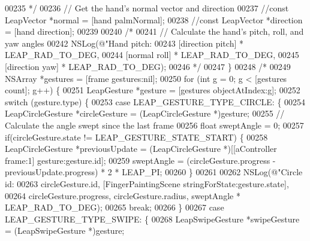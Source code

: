\begin{DoxyCode}
{{{{{{{00235 \textcolor{comment}{         */}
00236         \textcolor{comment}{// Get the hand's normal vector and direction}
00237         \textcolor{comment}{//const LeapVector *normal = [hand palmNormal];}
00238         \textcolor{comment}{//const LeapVector *direction = [hand direction];}
00239         
00240         \textcolor{comment}{/*}
00241 \textcolor{comment}{         // Calculate the hand's pitch, roll, and yaw angles}
00242 \textcolor{comment}{         NSLog(@"Hand pitch: %
00243 \textcolor{comment}{         [direction pitch] * LEAP\_RAD\_TO\_DEG,}
00244 \textcolor{comment}{         [normal roll] * LEAP\_RAD\_TO\_DEG,}
00245 \textcolor{comment}{         [direction yaw] * LEAP\_RAD\_TO\_DEG);}
00246 \textcolor{comment}{         */}
00247     \}
00248     \textcolor{comment}{/*}
00249 \textcolor{comment}{    NSArray *gestures = [frame gestures:nil];}
00250 \textcolor{comment}{    for (int g = 0; g < [gestures count]; g++) \{}
00251 \textcolor{comment}{        LeapGesture *gesture = [gestures objectAtIndex:g];}
00252 \textcolor{comment}{        switch (gesture.type) \{}
00253 \textcolor{comment}{            case LEAP\_GESTURE\_TYPE\_CIRCLE: \{}
00254 \textcolor{comment}{                LeapCircleGesture *circleGesture = (LeapCircleGesture *)gesture;}
00255 \textcolor{comment}{                // Calculate the angle swept since the last frame}
00256 \textcolor{comment}{                float sweptAngle = 0;}
00257 \textcolor{comment}{                if(circleGesture.state != LEAP\_GESTURE\_STATE\_START) \{}
00258 \textcolor{comment}{                    LeapCircleGesture *previousUpdate = (LeapCircleGesture *)[[aController frame:1]
       gesture:gesture.id];}
00259 \textcolor{comment}{                    sweptAngle = (circleGesture.progress - previousUpdate.progress) * 2 * LEAP\_PI;}
00260 \textcolor{comment}{                \}}
00261 \textcolor{comment}{                }
00262 \textcolor{comment}{                NSLog(@"Circle id: %
00263 \textcolor{comment}{                      circleGesture.id, [FingerPaintingScene stringForState:gesture.state],}
00264 \textcolor{comment}{                      circleGesture.progress, circleGesture.radius, sweptAngle * LEAP\_RAD\_TO\_DEG);}
00265 \textcolor{comment}{                break;}
00266 \textcolor{comment}{            \}}
00267 \textcolor{comment}{            case LEAP\_GESTURE\_TYPE\_SWIPE: \{}
00268 \textcolor{comment}{                LeapSwipeGesture *swipeGesture = (LeapSwipeGesture *)gesture;}
}}}}}}}}}
\end{DoxyCode}
